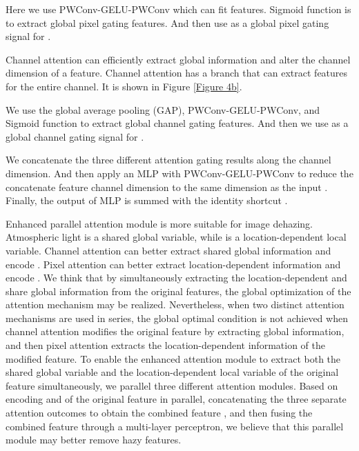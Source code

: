 \documentclass[10pt,twocolumn,letterpaper]{article}
\begin{document}
Here we use PWConv-GELU-PWConv which can fit features. Sigmoid function is to extract global pixel gating features. And then use  as a global pixel gating signal for . 

Channel attention can efficiently extract global information and alter the channel dimension of a feature. Channel attention has a  branch that can extract features for the entire channel. It is shown in Figure \ref{Figure 4b}.

We use the global average pooling (GAP), PWConv-GELU-PWConv, and Sigmoid function to extract global channel gating features. And then we use  as a global channel gating signal for .

We concatenate the three different attention gating results along the channel dimension. And then apply an MLP with PWConv-GELU-PWConv to reduce the concatenate feature channel dimension to the same dimension as the input . Finally, the output of MLP is summed with the identity shortcut .

Enhanced parallel attention module is more suitable for image dehazing. Atmospheric light  is a shared global variable, while  is a location-dependent local variable. Channel attention can better extract shared global information and encode . Pixel attention can better extract location-dependent information and encode . We think that by simultaneously extracting the location-dependent and share global information from the original features, the global optimization of the attention mechanism may be realized.
Nevertheless, when two distinct attention mechanisms are used in series, the global optimal condition is not achieved when channel attention modifies the original feature by extracting global information, and then pixel attention extracts the location-dependent information of the modified feature.
To enable the enhanced attention module to extract both the shared global variable and the location-dependent local variable of the original feature simultaneously, we parallel three different attention modules.
Based on encoding  and  of the original feature in parallel, concatenating the three separate attention outcomes to obtain the combined feature , and then fusing the combined feature  through a multi-layer perceptron, we believe that this parallel module may better remove hazy features.
\end{document}
